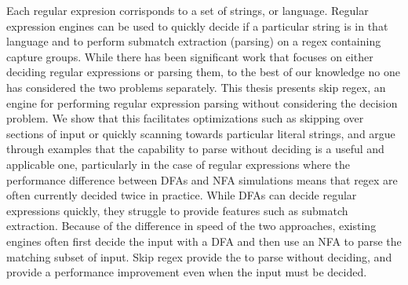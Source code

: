 \begin{thesisabstract}

Each regular expresion corrisponds to a set of strings, or
language. Regular expression engines can be used to quickly decide
if a particular string is in that language and to
perform submatch extraction (parsing) on a regex containing
capture groups. While there has been significant work that focuses on either
deciding regular expressions or parsing them, to
the best of our knowledge no one has considered the
two problems separately. This thesis presents skip
regex, an engine for performing regular expression
parsing without considering the decision problem.
We show that this facilitates optimizations such as skipping
over sections of input or quickly scanning towards particular
literal strings, and argue through examples that the capability to parse
without deciding is a useful and applicable one, particularly
in the case of regular expressions where the performance
difference between DFAs and NFA simulations means that regex are
often currently decided twice in practice. While DFAs can decide
regular expressions quickly, they struggle to provide features
such as submatch extraction. Because of the difference in speed
of the two approaches, existing engines often first decide the input
with a DFA and then use an NFA to parse the matching subset of input.
Skip regex provide the to parse without deciding,
and provide a performance improvement even when the input must
be decided.

\nopagebreak
\end{thesisabstract}
